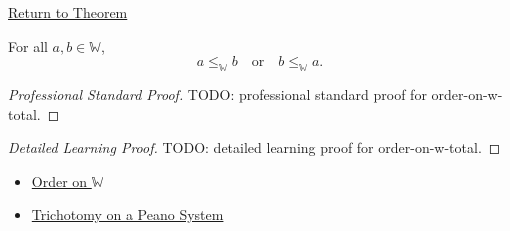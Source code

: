 \newpage
{}
\label{prf:order-on-w-total}

\begin{remark*}[Return]
\hyperref[thm:order-on-w-total]{Return to Theorem}
\end{remark*}

\begin{theorem*}
For all $a,b\in\mathbb{W}$,
\[
a\leq_{\mathbb{W}}b
\quad\text{or}\quad
b\leq_{\mathbb{W}}a.
\]
\end{theorem*}

\begin{proof}[Professional Standard Proof]
\LRAProofBodyStart
TODO: professional standard proof for order-on-w-total.
\end{proof}

\begin{proof}[Detailed Learning Proof]
\LRAProofBodyStart
TODO: detailed learning proof for order-on-w-total.
\end{proof}

\begin{remark*}
\end{remark*}

\begin{dependencies}
\begin{itemize}
  \item \hyperref[def:order-on-w]{Order on $\mathbb{W}$}
  \item \hyperref[thm:trichotomy-on-peano-system]{Trichotomy on a Peano System}
\end{itemize}
\end{dependencies}

\clearpage
